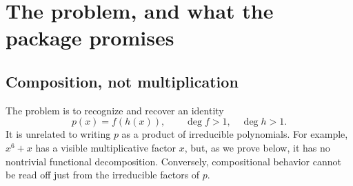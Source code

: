 \documentclass[11pt,letterpaper]{article}
\theoremstyle{definition}
\theoremstyle{remark}
\newcommand{\A}{\overline{\mathbb Q}}
\newcommand{\lc}{\operatorname{lc}}
\newcommand{\wt}[1]{\texttt{#1}}
\begin{document}
\begin{abstract}
Given $p\in\A[x]$, we seek a composition
$p=f_1\circ\cdots\circ f_r$ in which each nonlinear component is
indecomposable. The coefficients may be represented by radicals, polynomial
\wt{Root} objects, or \wt{AlgebraicNumber} values. We develop an exact,
factorization-free procedure valid mathematically over every field of
characteristic zero. For each proper divisor $d$ of $n=\deg p$, put $m=n/d$.
The unique possible normalized right component is the positive-degree part of
the formal $m$th root of $p/\lc(p)$ at infinity. A triangular recurrence
constructs it, and an $h$-adic expansion decides whether it is actually a
right component. This proves both completeness and descent to the original
coefficient field. Recursive splitting yields a complete chain; enumeration
by an indecomposable rightmost component gives all normalized complete
chains without parenthesization duplicates. The accompanying Wolfram
Language package uses exact coefficient vectors and coefficientwise
\wt{RootReduce}. Its elementary dense implementation takes
$O(n^2\tau(n))$ coefficient-field operations for one complete decomposition,
separately from the cost of algebraic-number arithmetic. Classical
factorization-free decomposition and Ritt theory provide the historical and
structural setting; the article derives the working algorithm directly.
\end{abstract}

\tableofcontents
\newpage

\section{The problem, and what the package promises}
\label{sec:scope}

\subsection{Composition, not multiplication}
The problem is to recognize and recover an identity
\begin{equation}\label{eq:basic}
 p(x)=f(h(x)),\qquad \deg f>1,\quad \deg h>1.
\end{equation}
It is unrelated to writing $p$ as a product of irreducible polynomials.
For example, $x^6+x$ has a visible multiplicative factor $x$, but, as we
prove below, it has no nontrivial functional decomposition. Conversely,
compositional behavior cannot be read off just from the irreducible factors
of $p$.
\end{document}
